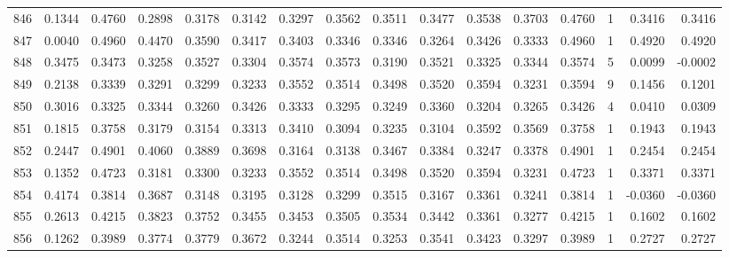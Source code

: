 \begin{tabular}{lrrrrrrrrrrrrrrr}
846 &      0.1344 &  0.4760 &  0.2898 &  0.3178 &  0.3142 &  0.3297 &  0.3562 &  0.3511 &  0.3477 &  0.3538 &   0.3703 &     0.4760 &      1 &                    0.3416 &                     0.3416 \\
847 &      0.0040 &  0.4960 &  0.4470 &  0.3590 &  0.3417 &  0.3403 &  0.3346 &  0.3346 &  0.3264 &  0.3426 &   0.3333 &     0.4960 &      1 &                    0.4920 &                     0.4920 \\
848 &      0.3475 &  0.3473 &  0.3258 &  0.3527 &  0.3304 &  0.3574 &  0.3573 &  0.3190 &  0.3521 &  0.3325 &   0.3344 &     0.3574 &      5 &                    0.0099 &                    -0.0002 \\
849 &      0.2138 &  0.3339 &  0.3291 &  0.3299 &  0.3233 &  0.3552 &  0.3514 &  0.3498 &  0.3520 &  0.3594 &   0.3231 &     0.3594 &      9 &                    0.1456 &                     0.1201 \\
850 &      0.3016 &  0.3325 &  0.3344 &  0.3260 &  0.3426 &  0.3333 &  0.3295 &  0.3249 &  0.3360 &  0.3204 &   0.3265 &     0.3426 &      4 &                    0.0410 &                     0.0309 \\
851 &      0.1815 &  0.3758 &  0.3179 &  0.3154 &  0.3313 &  0.3410 &  0.3094 &  0.3235 &  0.3104 &  0.3592 &   0.3569 &     0.3758 &      1 &                    0.1943 &                     0.1943 \\
852 &      0.2447 &  0.4901 &  0.4060 &  0.3889 &  0.3698 &  0.3164 &  0.3138 &  0.3467 &  0.3384 &  0.3247 &   0.3378 &     0.4901 &      1 &                    0.2454 &                     0.2454 \\
853 &      0.1352 &  0.4723 &  0.3181 &  0.3300 &  0.3233 &  0.3552 &  0.3514 &  0.3498 &  0.3520 &  0.3594 &   0.3231 &     0.4723 &      1 &                    0.3371 &                     0.3371 \\
854 &      0.4174 &  0.3814 &  0.3687 &  0.3148 &  0.3195 &  0.3128 &  0.3299 &  0.3515 &  0.3167 &  0.3361 &   0.3241 &     0.3814 &      1 &                   -0.0360 &                    -0.0360 \\
855 &      0.2613 &  0.4215 &  0.3823 &  0.3752 &  0.3455 &  0.3453 &  0.3505 &  0.3534 &  0.3442 &  0.3361 &   0.3277 &     0.4215 &      1 &                    0.1602 &                     0.1602 \\
856 &      0.1262 &  0.3989 &  0.3774 &  0.3779 &  0.3672 &  0.3244 &  0.3514 &  0.3253 &  0.3541 &  0.3423 &   0.3297 &     0.3989 &      1 &                    0.2727 &                     0.2727 \\

\end{tabular}
